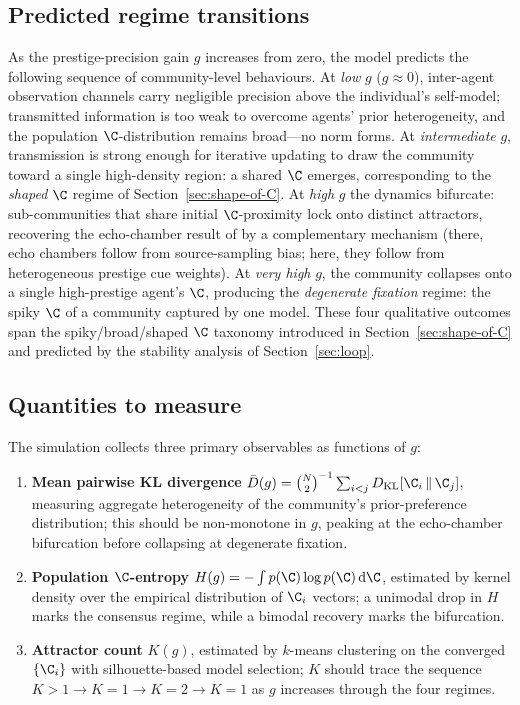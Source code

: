 \subsection*{Predicted regime transitions}

As the prestige-precision gain $g$ increases from zero, the model predicts
the following sequence of community-level behaviours. At \emph{low} $g$
($g \approx 0$), inter-agent observation channels carry negligible precision
above the individual's self-model; transmitted information is too weak to
overcome agents' prior heterogeneity, and the population $\C$-distribution
remains broad---no norm forms. At \emph{intermediate} $g$, transmission is
strong enough for iterative updating to draw the community toward a single
high-density region: a shared $\C$ emerges, corresponding to the
\emph{shaped} $\C$ regime of Section~\ref{sec:shape-of-C}. At \emph{high} $g$ the
dynamics bifurcate: sub-communities that share initial $\C$-proximity lock
onto distinct attractors, recovering the echo-chamber result of
\citet{albarracin2022EpistemicCommunities} by a complementary mechanism (there,
echo chambers follow from source-sampling bias; here, they follow from
heterogeneous prestige cue weights). At \emph{very high} $g$, the community
collapses onto a single high-prestige agent's $\C$, producing the
\emph{degenerate fixation} regime: the spiky $\C$ of a community captured by
one model.  These four qualitative outcomes span the spiky/broad/shaped $\C$
taxonomy introduced in Section~\ref{sec:shape-of-C} and predicted by the stability
analysis of Section~\ref{sec:loop}.

\subsection*{Quantities to measure}

The simulation collects three primary observables as functions of $g$:

\begin{enumerate}[label=(\roman*)]
  \item \textbf{Mean pairwise KL divergence} $\bar{D}(g) = \binom{N}{2}^{-1}
    \sum_{i < j} \KL{\C_i}{\C_j}$, measuring aggregate heterogeneity of the
    community's prior-preference distribution; this should be non-monotone in
    $g$, peaking at the echo-chamber bifurcation before collapsing at
    degenerate fixation.

  \item \textbf{Population $\C$-entropy} $H(g) = -\int p(\C) \log p(\C)\,
    \mathrm{d}\C$, estimated by kernel density over the empirical distribution
    of $\C_i$ vectors; a unimodal drop in $H$ marks the consensus regime,
    while a bimodal recovery marks the bifurcation.

  \item \textbf{Attractor count} $K(g)$, estimated by $k$-means clustering on
    the converged $\{\C_i\}$ with silhouette-based model selection; $K$
    should trace the sequence $K > 1 \to K = 1 \to K = 2 \to K = 1$ as $g$
    increases through the four regimes.
\end{enumerate}

